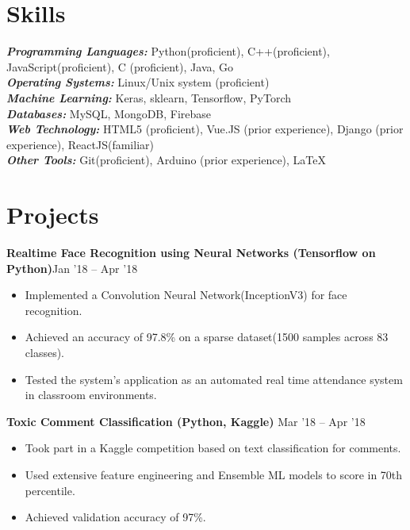 \documentclass[letter]{res}
\begin{document}
\address{
  \texttt{\url{www.github.com/shbm}}
  } 
\address{
  \texttt{shbm09@gmail.com}\\
  \texttt{(+91) 7571 998541}\\
  } 
\begin{resume}
  \noindent\makebox[\linewidth]{\rule{\paperwidth}{0.1pt}}

\section{Skills}
{\sl \textbf{Programming Languages:}}  Python(proficient), C++(proficient), JavaScript(proficient), C (proficient), Java, Go\\
{\sl \textbf{Operating Systems:}} Linux/Unix system (proficient)\\ 
{\sl \textbf{Machine Learning:}} Keras, sklearn, Tensorflow, PyTorch\\ 
{\sl \textbf{Databases:}} MySQL, MongoDB, Firebase\\
{\sl \textbf{Web Technology:}}  HTML5 (proficient), Vue.JS (prior experience), Django (prior experience), ReactJS(familiar)\\
{\sl \textbf{Other Tools:}}  Git(proficient), Arduino (prior experience), \LaTeX
 \vspace{-2mm}

\section{Projects}
\textbf{Realtime Face Recognition using Neural Networks (Tensorflow on Python)}\hfill Jan '18 – Apr '18\\
\begin{itemize}
  \vspace{-2mm}
 \item Implemented a Convolution Neural Network(InceptionV3) for face recognition.
 \item Achieved an accuracy of 97.8\% on a sparse dataset(1500 samples across 83 classes).
 \item Tested the system's application as an automated real time attendance system in classroom environments.
\end{itemize}

\textbf{Toxic Comment Classification (Python, Kaggle)}
\hfill Mar '18 – Apr '18\\
\begin{itemize}
  \vspace{-2mm}
 \item Took part in a Kaggle competition based on text classification for comments.
 \item Used extensive feature engineering and Ensemble ML models to score in 70th percentile.
 \item Achieved validation accuracy of  97\%.
 \end{itemize}


\end{resume}
\end{document}
